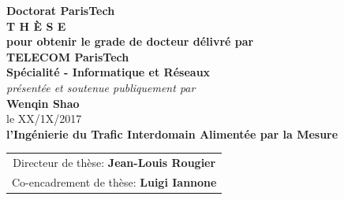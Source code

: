 \documentclass[11pt,a4paper]{book}
\renewcommand\textnumero{n$^{\textsf{{\tiny O}}}$}
\begin{document}
\begin{center}
%
\vspace{.5cm}
%
%
%
%
%
%
\vspace{1.0cm}
%
%
%
{\LARGE {\bf Doctorat ParisTech}}\\
\vspace{1.1cm}
{\LARGE {\bf T H \`{E} S E}}\\
\vspace{0.5cm}
{\normalsize {\bf pour obtenir le grade de docteur d\'{e}livr\'{e} par}}\\
%
%
%
\vspace{.9cm}
%
%
%
%
{\LARGE {\bf TELECOM ParisTech}}\\
\vspace{0.6cm}
{\Large {\bf Sp\'{e}cialit\'{e} - Informatique et R\'{e}seaux }}\\
%
%
%
\vspace{.8cm}
%
%
%
{\normalsize {\it pr\'{e}sent\'{e}e et soutenue publiquement par}}\\
\vspace{0.7cm}
{\Large {\bf Wenqin Shao}}\\
\vspace{0.24cm}
{\normalsize le XX/1X/2017}\\
%
%
%
\vfill
%
%
%
\textcolor[RGB]{191,18,56}{
\noindent
\LARGE {\bf  l'Ingénierie du Trafic Interdomain Alimentée par la Mesure}
}
%
%
%
\vfill
%
%
%
{\normalsize
\begin{tabular}{c}
Directeur de th\`{e}se:					{\bf Jean-Louis Rougier}\\
Co-encadrement de th\`{e}se:		{\bf Luigi Iannone }
\end{tabular}
}
\end{center}
%
%
%
\vfill
%
%
%
\flushleft
\end{document}
